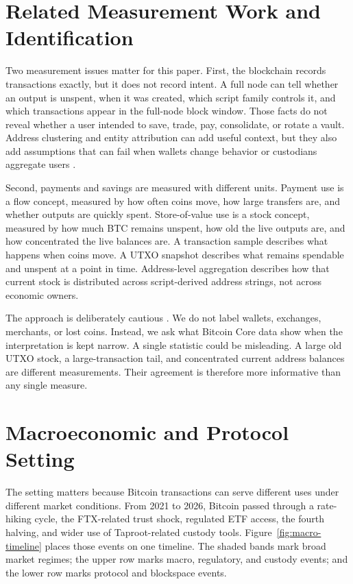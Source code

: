 \documentclass[conference]{IEEEtran}
\newcommand{\btc}{Bitcoin}
\begin{document}
\section{Related Measurement Work and Identification}\label{sec:related}

Two measurement issues matter for this paper. First, the blockchain records
transactions exactly, but it does not record intent. A full node can tell
whether an output is unspent, when it was created, which script family
controls it, and which transactions appear in the full-node block window.
Those facts do not reveal whether a user intended to save, trade, pay,
consolidate, or rotate a vault. Address clustering and entity attribution
can add useful context, but they also add assumptions that can fail when
wallets change behavior or custodians aggregate users
\cite{meiklejohn2013fistful, moser2017anonymous, kalodner2020blocksci,
moser2022resurrecting}.

Second, payments and savings are measured with different units. Payment use
is a flow concept, measured by how often coins move, how large transfers
are, and whether outputs are quickly spent. Store-of-value use is a stock
concept, measured by how much BTC remains unspent, how old the live outputs
are, and how concentrated the live balances are. A transaction sample describes what
happens when coins move. A UTXO snapshot describes what remains spendable
and unspent at a point in time. Address-level aggregation describes how that
current stock is distributed across script-derived address strings, not
across economic owners.

The approach is deliberately cautious
\cite{manski1990nonparametric, manski2003partial}. We do not label wallets,
exchanges, merchants, or lost coins. Instead, we ask what Bitcoin Core data
show when the interpretation is kept narrow. A single statistic could be
misleading. A large old UTXO stock, a large-transaction tail, and
concentrated current address balances are different measurements. Their
agreement is therefore more informative than any single measure.

\section{Macroeconomic and Protocol Setting}\label{sec:setting}

The setting matters because Bitcoin transactions can serve different uses
under different market conditions. From 2021 to 2026, \btc{} passed through
a rate-hiking cycle, the FTX-related trust shock, regulated ETF access, the
fourth halving, and wider use of Taproot-related custody tools.
Figure~\ref{fig:macro-timeline} places those events on one timeline. The
shaded bands mark broad market regimes; the upper row marks macro,
regulatory, and custody events; and the lower row marks protocol and
blockspace events.
\end{document}

